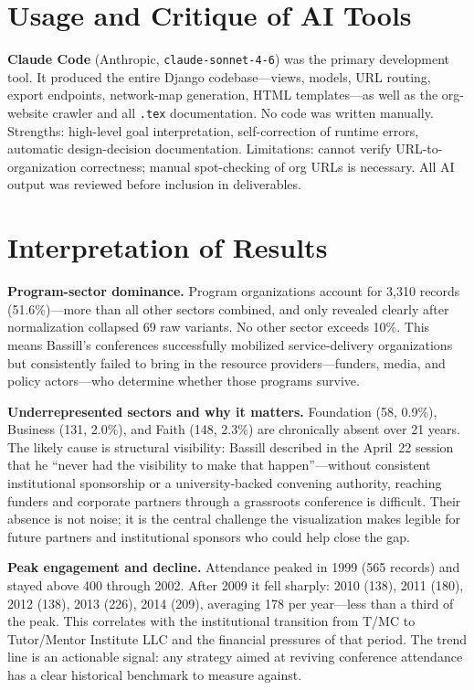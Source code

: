 \documentclass[10pt,twocolumn,letterpaper]{article}
\begin{document}
\section{Usage and Critique of AI Tools}

\textbf{Claude Code} (Anthropic, \texttt{claude-sonnet-4-6}) was
the primary development tool. It produced the entire Django
codebase---views, models, URL routing, export endpoints,
network-map generation, HTML templates---as well as the org-website
crawler and all \texttt{.tex} documentation. No code was written
manually. Strengths: high-level goal interpretation, self-correction
of runtime errors, automatic design-decision documentation.
Limitations: cannot verify URL-to-organization correctness; manual
spot-checking of org URLs is necessary. All AI output was reviewed
before inclusion in deliverables.

\section{Interpretation of Results}

\textbf{Program-sector dominance.} Program organizations account for
3,310 records (51.6\%)---more than all other sectors combined, and
only revealed clearly after normalization collapsed 69 raw variants.
No other sector exceeds 10\%. This means Bassill's conferences
successfully mobilized service-delivery organizations but consistently
failed to bring in the resource providers---funders, media, and
policy actors---who determine whether those programs survive.

\textbf{Underrepresented sectors and why it matters.}
Foundation (58, 0.9\%), Business (131, 2.0\%), and Faith (148, 2.3\%)
are chronically absent over 21 years. The likely cause is structural
visibility: Bassill described in the April~22 session that he
``never had the visibility to make that happen''---without consistent
institutional sponsorship or a university-backed convening authority,
reaching funders and corporate partners through a grassroots conference
is difficult. Their absence is not noise; it is the central challenge
the visualization makes legible for future partners and institutional
sponsors who could help close the gap.

\textbf{Peak engagement and decline.} Attendance peaked in 1999
(565 records) and stayed above 400 through 2002. After 2009 it fell
sharply: 2010 (138), 2011 (180), 2012 (138), 2013 (226), 2014 (209),
averaging 178 per year---less than a third of the peak. This correlates
with the institutional transition from T/MC to Tutor/Mentor Institute
LLC and the financial pressures of that period. The trend line is an
actionable signal: any strategy aimed at reviving conference attendance
has a clear historical benchmark to measure against.
\end{document}
